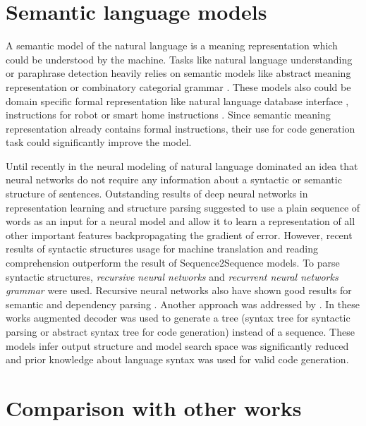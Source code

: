 \section{Semantic language models}
A semantic model of the natural language is a meaning representation which could be understood by the machine. Tasks like natural language understanding or paraphrase detection heavily relies on semantic models like abstract meaning representation \parencite{banarescu2013abstract} or combinatory categorial grammar \parencite{Clark2007}. These models also could be domain specific formal representation like natural language database interface \parencite{Zettlemoyer2012, berant2013semantic}, instructions for robot \parencite{artzi2013weakly} or smart home instructions \parencite{quirk2015language}. Since semantic meaning representation already contains formal instructions, their use for code generation task could significantly improve the model. 

Until recently in the neural modeling of natural language dominated an idea that neural networks do not require any information about a syntactic or semantic structure of sentences. Outstanding results of deep neural networks in representation learning and structure parsing suggested to use a plain sequence of words as an input for a neural model and allow it to learn a representation of all other important features backpropagating the gradient of error. However, recent results of syntactic structures usage for machine translation \parencite{Chen2017} and reading comprehension \parencite{xie2017constituent} outperform the result of Sequence2Sequence models. To parse syntactic structures, \emph{recursive neural networks} \parencite{Goller, socher2011parsing} and \emph{recurrent neural networks grammar} \parencite{Dyer2016} were used. Recursive neural networks also have shown good results for semantic \parencite{Tai2015} and dependency parsing \parencite{Zhu2015}. Another approach was addressed by \cite{Dong2016, Yin2017, Rabinovich2017}. In these works augmented decoder was used to generate a tree (syntax tree for syntactic parsing or abstract syntax tree for code generation) instead of a sequence. These models infer output structure and model search space was significantly reduced and prior knowledge about language syntax was used for valid code generation.

\section{Comparison with other works}

